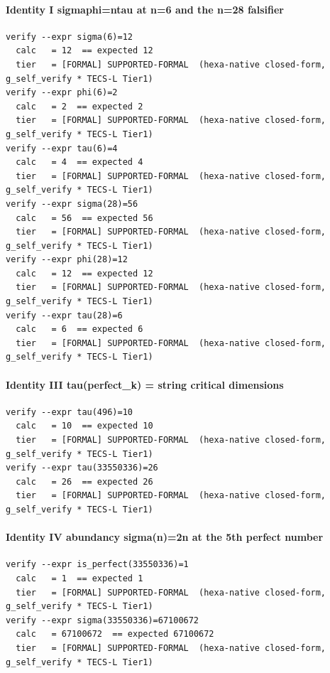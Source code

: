 \documentclass[11pt,a4paper]{article}
\theoremstyle{definition}
\begin{document}
\paragraph{Identity I  sigmaphi=ntau at n=6 and the n=28 falsifier}
\begin{verbatim}
verify --expr sigma(6)=12
  calc   = 12  == expected 12
  tier   = [FORMAL] SUPPORTED-FORMAL  (hexa-native closed-form, g_self_verify * TECS-L Tier1)
verify --expr phi(6)=2
  calc   = 2  == expected 2
  tier   = [FORMAL] SUPPORTED-FORMAL  (hexa-native closed-form, g_self_verify * TECS-L Tier1)
verify --expr tau(6)=4
  calc   = 4  == expected 4
  tier   = [FORMAL] SUPPORTED-FORMAL  (hexa-native closed-form, g_self_verify * TECS-L Tier1)
verify --expr sigma(28)=56
  calc   = 56  == expected 56
  tier   = [FORMAL] SUPPORTED-FORMAL  (hexa-native closed-form, g_self_verify * TECS-L Tier1)
verify --expr phi(28)=12
  calc   = 12  == expected 12
  tier   = [FORMAL] SUPPORTED-FORMAL  (hexa-native closed-form, g_self_verify * TECS-L Tier1)
verify --expr tau(28)=6
  calc   = 6  == expected 6
  tier   = [FORMAL] SUPPORTED-FORMAL  (hexa-native closed-form, g_self_verify * TECS-L Tier1)
\end{verbatim}

\paragraph{Identity III  tau(perfect\_k) = string critical dimensions}
\begin{verbatim}
verify --expr tau(496)=10
  calc   = 10  == expected 10
  tier   = [FORMAL] SUPPORTED-FORMAL  (hexa-native closed-form, g_self_verify * TECS-L Tier1)
verify --expr tau(33550336)=26
  calc   = 26  == expected 26
  tier   = [FORMAL] SUPPORTED-FORMAL  (hexa-native closed-form, g_self_verify * TECS-L Tier1)
\end{verbatim}

\paragraph{Identity IV  abundancy sigma(n)=2n at the 5th perfect number}
\begin{verbatim}
verify --expr is_perfect(33550336)=1
  calc   = 1  == expected 1
  tier   = [FORMAL] SUPPORTED-FORMAL  (hexa-native closed-form, g_self_verify * TECS-L Tier1)
verify --expr sigma(33550336)=67100672
  calc   = 67100672  == expected 67100672
  tier   = [FORMAL] SUPPORTED-FORMAL  (hexa-native closed-form, g_self_verify * TECS-L Tier1)
\end{verbatim}



\end{document}
